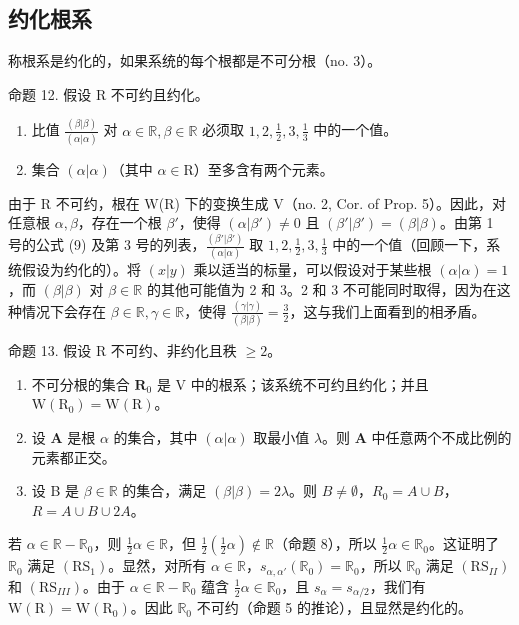 \subsection{约化根系}

称根系是约化的，如果系统的每个根都是不可分根（no. 3）。

命题 12. 假设 R 不可约且约化。

\begin{enumerate}
\def\labelenumi{(\roman{enumi})}
\item
  比值 \(\frac{(\beta|\beta)}{(\alpha|\alpha)}\) 对 \(\alpha \in \mathbb{R}, \beta \in \mathbb{R}\) 必须取 \(1, 2, \frac{1}{2}, 3, \frac{1}{3}\) 中的一个值。
\item
  集合 \((\alpha |\alpha)\)（其中 \(\alpha \in \mathrm{R}\)）至多含有两个元素。
\end{enumerate}

由于 R 不可约，根在 W(R) 下的变换生成 V（no. 2, Cor. of Prop. 5）。因此，对任意根 \(\alpha, \beta\)，存在一个根 \(\beta'\)，使得 \((\alpha|\beta') \neq 0\) 且 \((\beta'|\beta') = (\beta|\beta)\)。由第 1 号的公式 (9) 及第 3 号的列表，\(\frac{(\beta'|\beta')}{(\alpha|\alpha)}\) 取 \(1, 2, \frac{1}{2}, 3, \frac{1}{3}\) 中的一个值（回顾一下，系统假设为约化的）。将 \((x|y)\) 乘以适当的标量，可以假设对于某些根 \((\alpha|\alpha) = 1\)，而 \((\beta|\beta)\) 对 \(\beta \in \mathbb{R}\) 的其他可能值为 2 和 3。2 和 3 不可能同时取得，因为在这种情况下会存在 \(\beta \in \mathbb{R}, \gamma \in \mathbb{R}\)，使得 \(\frac{(\gamma|\gamma)}{(\beta|\beta)} = \frac{3}{2}\)，这与我们上面看到的相矛盾。

命题 13. 假设 R 不可约、非约化且秩 \(\geqslant 2\)。

\begin{enumerate}
\def\labelenumi{(\roman{enumi})}
\item
  不可分根的集合 \(\mathbf{R}_0\) 是 V 中的根系；该系统不可约且约化；并且 \(\mathrm{W}(\mathrm{R}_0) = \mathrm{W}(\mathrm{R})\)。
\item
  设 \(\mathbf{A}\) 是根 \(\alpha\) 的集合，其中 \((\alpha |\alpha)\) 取最小值 \(\lambda\)。则 \(\mathbf{A}\) 中任意两个不成比例的元素都正交。
\item
  设 B 是 \(\beta \in \mathbb{R}\) 的集合，满足 \((\beta |\beta) = 2\lambda\)。则 \(B \neq \emptyset\)，\(R_0 = A \cup B\)，\(R = A \cup B \cup 2A\)。
\end{enumerate}

若 \(\alpha \in \mathbb{R} - \mathbb{R}_0\)，则 \(\frac{1}{2}\alpha \in \mathbb{R}\)，但 \(\frac{1}{2}\left(\frac{1}{2}\alpha\right) \notin \mathbb{R}\)（命题 8），所以 \(\frac{1}{2}\alpha \in \mathbb{R}_0\)。这证明了 \(\mathbb{R}_0\) 满足 \((\mathrm{RS}_1)\)。显然，对所有 \(\alpha \in \mathbb{R}\)，\(s_{\alpha, \alpha'}(\mathbb{R}_0) = \mathbb{R}_0\)，所以 \(\mathbb{R}_0\) 满足 \((\mathrm{RS}_{II})\) 和 \((\mathrm{RS}_{III})\)。由于 \(\alpha \in \mathbb{R} - \mathbb{R}_0\) 蕴含 \(\frac{1}{2}\alpha \in \mathbb{R}_0\)，且 \(s_\alpha = s_{\alpha/2}\)，我们有 \(\mathrm{W}(\mathrm{R}) = \mathrm{W}(\mathrm{R}_0)\)。因此 \(\mathbb{R}_0\) 不可约（命题 5 的推论），且显然是约化的。


